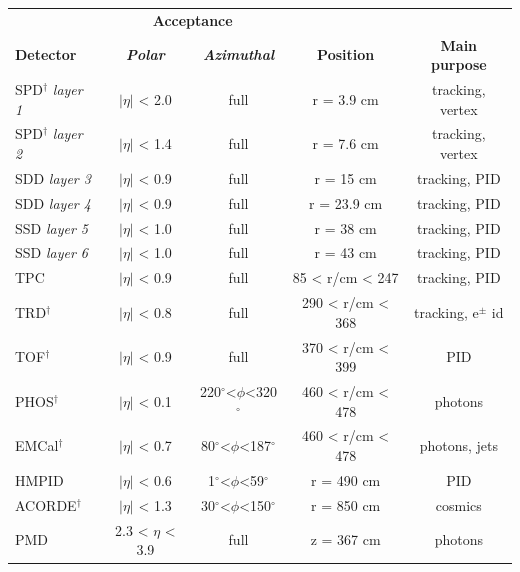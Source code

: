 \begingroup
\setlength{\tabcolsep}{6pt} %
\renewcommand{\arraystretch}{1.2} %
\begin{table}[!tp]\small
\centering
	\begin{tabular*}{\textwidth}{@{\extracolsep{\fill}}lcccc}
	\toprule
		     & \multicolumn{2}{c}{\normalsize{\textbf{Acceptance}}} \\
	\textbf{\normalsize{Detector}} & \textit{\textbf{Polar}} & \textit{\textbf{Azimuthal}} & \textbf{\normalsize{Position}} & \textbf{\normalsize{Main purpose}}	 \\
    \midrule
	SPD$^{\dagger}$	\textit{layer 1}     & $|\eta|$ < 2.0	  & full			& r = 3.9 cm		& tracking, vertex\\
	SPD$^{\dagger}$	\textit{layer 2}     & $|\eta|$ < 1.4	  & full			& r = 7.6 cm		& tracking, vertex\\
	SDD	\textit{ layer 3}		         & $|\eta|$ < 0.9	  & full			& r = 15 cm		    & tracking, PID\\
	SDD	\textit{ layer 4}		         & $|\eta|$ < 0.9	  & full			& r = 23.9 cm	    & tracking, PID\\
    SSD	\textit{ layer 5}			     & $|\eta|$ < 1.0	  & full			& r = 38 cm		    & tracking, PID\\
    SSD	\textit{ layer 6}			     & $|\eta|$ < 1.0	  & full			& r = 43 cm		    & tracking, PID\\
    TPC	                                 & $|\eta|$ < 0.9     & full			& 85 < r/cm < 247   & tracking, PID \\
    TRD$^{\dagger}$	                     & $|\eta|$ < 0.8     & full			& 290 < r/cm < 368  & tracking, e$^{\pm}$ id \\
    TOF$^{\dagger}$	                     & $|\eta|$ < 0.9     & full			& 370 < r/cm < 399  & PID \\
    PHOS$^{\dagger}$                     & $|\eta|$ < 0.1    & 220$^{\circ}$<$\phi$<320$^{\circ}$	& 460 < r/cm < 478 & photons \\
    EMCal$^{\dagger}$                    & $|\eta|$ < 0.7     & 80$^{\circ}$<$\phi$<187$^{\circ}$	& 460 < r/cm < 478 & photons, jets \\
    HMPID                                & $|\eta|$ < 0.6     & 1$^{\circ}$<$\phi$<59$^{\circ}$		& r = 490 cm       & PID \\
    ACORDE$^{\dagger}$                   & $|\eta|$ < 1.3     & 30$^{\circ}$<$\phi$<150$^{\circ}$   & r = 850 cm       & cosmics \\
    \midrule
    PMD		                 & 2.3 < $\eta$ < 3.9   & full			& z = 367 cm		& photons\\

\end{tabular*}
\end{table}
